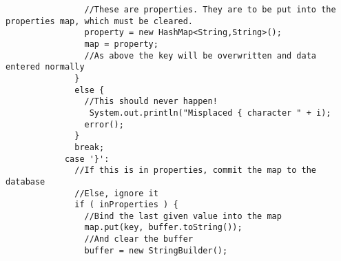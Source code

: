 \begin{lstlisting}
                //These are properties. They are to be put into the properties map, which must be cleared.
                property = new HashMap<String,String>();
                map = property;
                //As above the key will be overwritten and data entered normally
              }
              else {
                //This should never happen!
                 System.out.println("Misplaced { character " + i);
                error();
              }
              break;
            case '}':
              //If this is in properties, commit the map to the database
              //Else, ignore it
              if ( inProperties ) {
                //Bind the last given value into the map
                map.put(key, buffer.toString());
                //And clear the buffer
                buffer = new StringBuilder();
					  

\end{lstlisting}
